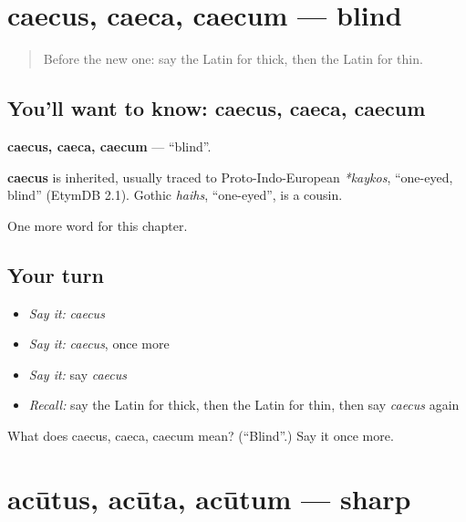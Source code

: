 \section[caecus, caeca, caecum]{caecus, caeca, caecum — blind}

\label{lesson:LA-C144-caecus}



\begin{quote}
Before the new one: say the Latin for thick, then the Latin for thin.
\end{quote}

\subsection*{You'll want to know: caecus, caeca, caecum}
\textbf{caecus, caeca, caecum} — \textquotedblleft{}blind\textquotedblright{}.

\begin{cousinweb}
\textbf{caecus} is inherited, usually traced to Proto-Indo-European \emph{*kaykos}, \textquotedblleft{}one-eyed, blind\textquotedblright{} (EtymDB 2.1). Gothic \emph{haihs}, \textquotedblleft{}one-eyed\textquotedblright{}, is a cousin.
\end{cousinweb}

\begin{grammarlens}[title={What you've built}]
One more word for this chapter.
\end{grammarlens}

\subsection*{Your turn}
\begin{itemize}
\raggedright
  \item \emph{Say it:} \emph{caecus}
  \item \emph{Say it:} \emph{caecus}, once more
  \item \emph{Say it:} say \emph{caecus}
  \item \emph{Recall:} say the Latin for thick, then the Latin for thin, then say \emph{caecus} again
\end{itemize}

\begin{tcolorbox}[breakable,colback=teal!4,colframe=teal!35!black,title={Before you move on}]
What does caecus, caeca, caecum mean? (\textquotedblleft{}Blind\textquotedblright{}.) Say it once more.
\end{tcolorbox}
\section[acūtus, acūta, acūtum]{acūtus, acūta, acūtum — sharp}

